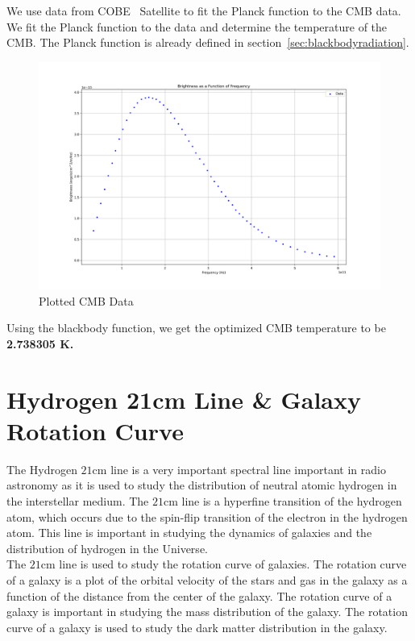 We use data from COBE~\cite{1990ApJ...354L..37M} Satellite to fit the Planck function to the CMB data. We fit the Planck function to the data and determine the temperature of the CMB. The Planck function is already defined in section~\ref{sec:blackbodyradiation}.

\begin{figure}[H]
	\centering
	\includegraphics[width=\textwidth]{Images/COBE_CMB_data.png}
	\caption{Plotted CMB Data}
	\label{fig:cmb_fit}
\end{figure}

Using the blackbody function, we get the optimized CMB temperature to be \textbf{2.738305 K.}

\clearpage

\section{Hydrogen 21cm Line \& Galaxy Rotation Curve}

The Hydrogen $21$cm line is a very important spectral line important in radio astronomy as it is used to study the distribution of neutral atomic hydrogen in the interstellar medium. The $21$cm line is a hyperfine transition of the hydrogen atom, which occurs due to the spin-flip transition of the electron in the hydrogen atom. This line is important in studying the dynamics of galaxies and the distribution of hydrogen in the Universe. \\

The $21$cm line is used to study the rotation curve of galaxies. The rotation curve of a galaxy is a plot of the orbital velocity of the stars and gas in the galaxy as a function of the distance from the center of the galaxy. The rotation curve of a galaxy is important in studying the mass distribution of the galaxy. The rotation curve of a galaxy is used to study the dark matter distribution in the galaxy. \\

